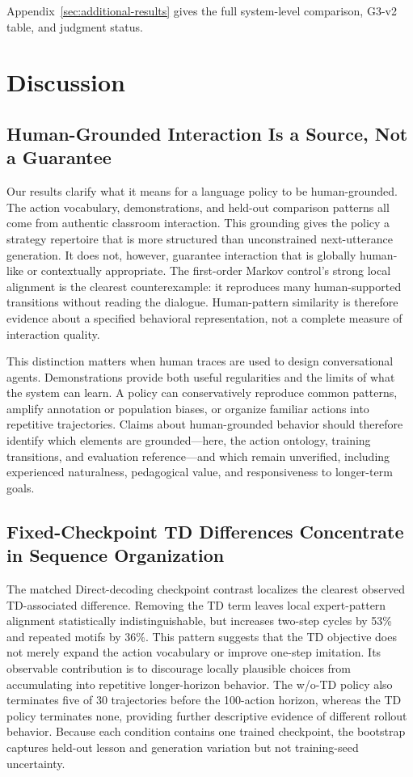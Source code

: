 \documentclass[manuscript,review,anonymous]{acmart}
\begin{document}
Appendix~\ref{sec:additional-results} gives the full system-level comparison,
G3-v2 table, and judgment status.
 
\section{Discussion}

\subsection{Human-Grounded Interaction Is a Source, Not a Guarantee}

Our results clarify what it means for a language policy to be
human-grounded. The action vocabulary, demonstrations, and held-out comparison
patterns all come from authentic classroom interaction. This grounding gives
the policy a strategy repertoire that is more structured than unconstrained
next-utterance generation. It does not, however, guarantee interaction that is
globally human-like or contextually appropriate. The first-order Markov
control's strong local alignment is the clearest counterexample: it reproduces
many human-supported transitions without reading the dialogue. Human-pattern
similarity is therefore evidence about a specified behavioral representation,
not a complete measure of interaction quality.

This distinction matters when human traces are used to design conversational
agents. Demonstrations provide both useful regularities and the limits of what
the system can learn. A policy can conservatively reproduce common patterns,
amplify annotation or population biases, or organize familiar actions into
repetitive trajectories. Claims about human-grounded behavior should therefore
identify which elements are grounded---here, the action ontology, training
transitions, and evaluation reference---and which remain unverified, including
experienced naturalness, pedagogical value, and responsiveness to longer-term
goals.

\subsection{Fixed-Checkpoint TD Differences Concentrate in Sequence Organization}

The matched Direct-decoding checkpoint contrast localizes the clearest observed
TD-associated difference. Removing the TD term leaves local
expert-pattern alignment statistically indistinguishable, but increases
two-step cycles by 53\% and repeated motifs by 36\%. This pattern suggests that
the TD objective does not merely expand the action vocabulary or improve
one-step imitation. Its observable contribution is to discourage locally
plausible choices from accumulating into repetitive longer-horizon behavior.
The w/o-TD policy also terminates five of 30 trajectories before the
100-action horizon, whereas the TD policy terminates none, providing further
descriptive evidence of different rollout behavior. Because each condition
contains one trained checkpoint, the bootstrap captures held-out lesson and
generation variation but not training-seed uncertainty.
\end{document}
